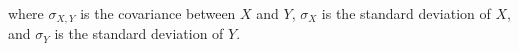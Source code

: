 \noindent where
$
\sigma_{X, Y}
$
is the covariance between
$
X
$
and
$
Y
$,
$
\sigma_{X}
$
is the standard deviation of
$
X
$,
and
$
\sigma_{Y}
$
is the standard deviation of
$
Y
$.
